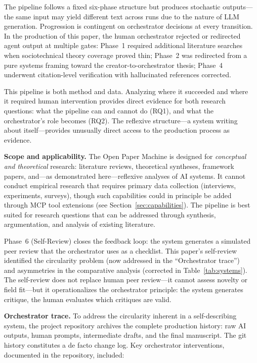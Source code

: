 \documentclass{article}
\begin{document}
The pipeline follows a fixed six-phase structure but produces stochastic outputs---the same input may yield different text across runs due to the nature of LLM generation. Progression is contingent on orchestrator decisions at every transition. In the production of this paper, the human orchestrator rejected or redirected agent output at multiple gates: Phase~1 required additional literature searches when sociotechnical theory coverage proved thin; Phase~2 was redirected from a pure systems framing toward the creator-to-orchestrator thesis; Phase~4 underwent citation-level verification with hallucinated references corrected.

This pipeline is both method and data. Analyzing where it succeeded and where it required human intervention provides direct evidence for both research questions: what the pipeline can and cannot do (RQ1), and what the orchestrator's role becomes (RQ2). The reflexive structure---a system writing about itself---provides unusually direct access to the production process as evidence.

\textbf{Scope and applicability.} The Open Paper Machine is designed for \textit{conceptual and theoretical} research: literature reviews, theoretical syntheses, framework papers, and---as demonstrated here---reflexive analyses of AI systems. It cannot conduct empirical research that requires primary data collection (interviews, experiments, surveys), though such capabilities could in principle be added through MCP tool extensions (see Section~\ref{sec:capabilities}). The pipeline is best suited for research questions that can be addressed through synthesis, argumentation, and analysis of existing literature.

Phase~6 (Self-Review) closes the feedback loop: the system generates a simulated peer review that the orchestrator uses as a checklist. This paper's self-review identified the circularity problem (now addressed in the ``Orchestrator trace'') and asymmetries in the comparative analysis (corrected in Table~\ref{tab:systems}). The self-review does not replace human peer review---it cannot assess novelty or field fit---but it operationalizes the orchestrator principle: the system generates critique, the human evaluates which critiques are valid.

\textbf{Orchestrator trace.} To address the circularity inherent in a self-describing system, the project repository archives the complete production history: raw AI outputs, human prompts, intermediate drafts, and the final manuscript. The git history constitutes a de facto change log. Key orchestrator interventions, documented in the repository, included:
\end{document}
